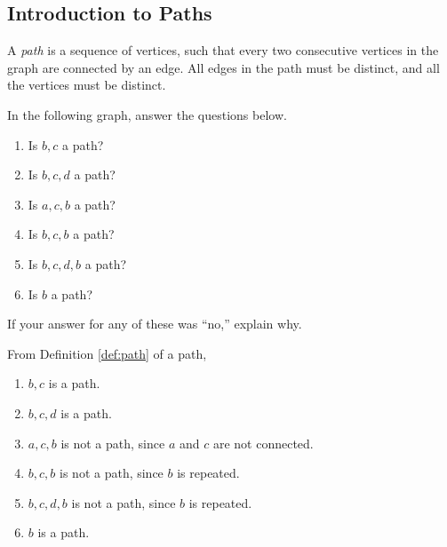 \documentclass[11pt]{article}
\begin{document}
\subsection{Introduction to Paths}

\begin{definition}
\label{def:path}
A \textit{path} is a sequence of vertices, such that every two consecutive vertices in the graph are connected by an edge.
All edges in the path must be distinct, and all the vertices must be distinct.
\end{definition}

\begin{problem} %
In the following graph, answer the questions below.
\begin{center}
\end{center}
\begin{enumerate}[label=(\alph*)]
\item Is $b,c$ a path?
\item Is $b,c,d$ a path?
\item Is $a,c,b$ a path?
\item Is $b,c,b$ a path?
\item Is $b,c,d,b$ a path?
\item Is $b$ a path?
\end{enumerate}
If your answer for any of these was ``no,'' explain why.
\end{problem}

\begin{solution}
From Definition \ref{def:path} of a path,
\begin{enumerate}[label=(\alph*)]
\item $b,c$ is a path.
\item $b,c,d$ is a path.
\item $a,c,b$ is not a path, since $a$ and $c$ are not connected.
\item $b,c,b$ is not a path, since $b$ is repeated.
\item $b,c,d,b$ is not a path, since $b$ is repeated.
\item $b$ is a path.
\end{enumerate}
\end{solution}
\end{document}
